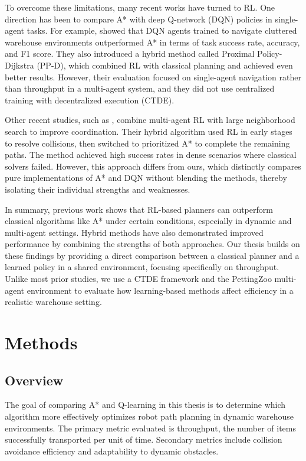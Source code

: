 \documentclass{kththesis}
\begin{document}
To overcome these limitations, many recent works have turned to RL. One direction has been to compare A* with deep Q-network (DQN) policies in single-agent tasks. For example, \cite{Li} showed that DQN agents trained to navigate cluttered warehouse environments outperformed A* in terms of task success rate, accuracy, and F1 score. They also introduced a hybrid method called Proximal Policy-Dijkstra (PP-D), which combined RL with classical planning and achieved even better results. However, their evaluation focused on single-agent navigation rather than throughput in a multi-agent system, and they did not use centralized training with decentralized execution (CTDE).

Other recent studies, such as \cite{wang}, combine multi-agent RL with large neighborhood search to improve coordination. Their hybrid algorithm used RL in early stages to resolve collisions, then switched to prioritized A* to complete the remaining paths. The method achieved high success rates in dense scenarios where classical solvers failed. However, this approach differs from ours, which distinctly compares pure implementations of A* and DQN without blending the methods, thereby isolating their individual strengths and weaknesses.

In summary, previous work shows that RL-based planners can outperform classical algorithms like A* under certain conditions, especially in dynamic and multi-agent settings. Hybrid methods have also demonstrated improved performance by combining the strengths of both approaches. Our thesis builds on these findings by providing a direct comparison between a classical planner and a learned policy in a shared environment, focusing specifically on throughput. Unlike most prior studies, we use a CTDE framework and the PettingZoo multi-agent environment to evaluate how learning-based methods affect efficiency in a realistic warehouse setting.


\chapter{Methods}

\section{Overview}
The goal of comparing A* and Q-learning in this thesis is to determine which algorithm more effectively optimizes robot path planning in dynamic warehouse environments. The primary metric evaluated is throughput, the number of items successfully transported per unit of time. Secondary metrics include collision avoidance efficiency and adaptability to dynamic obstacles. 
\end{document}

